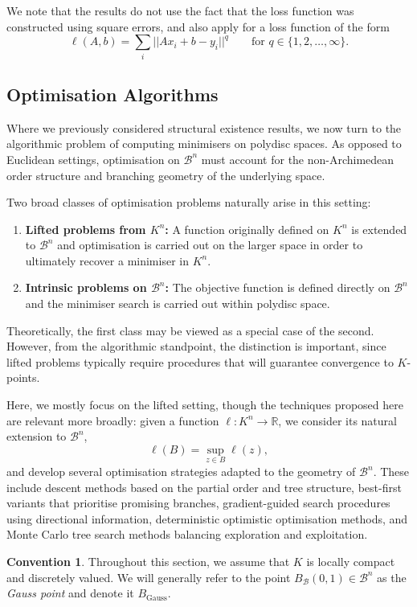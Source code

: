 \documentclass[10pt]{article}
\theoremstyle{definition}
\newtheorem{convention}[theorem]{Convention}
\begin{document}
We note that the results do not use the fact that the loss function was constructed using square errors, and also apply for a loss function of the form
$$
    \ell(A, b) = \sum_i \lvert \lvert A x_i + b - y_i \rvert \rvert ^ q \qquad\text{for }q \in \{1, 2, \dotsc, \infty\}.
$$

\subsection{Optimisation Algorithms}

Where we previously considered structural existence results, we now turn to the algorithmic problem of computing minimisers on polydisc spaces. As opposed to Euclidean settings, optimisation on $\mathcal{B}^n$ must account for the non-Archimedean order structure and branching geometry of the underlying space.

Two broad classes of optimisation problems naturally arise in this setting:
\begin{enumerate}
\item \textbf{Lifted problems from $K^n$:} A function originally defined on $K^n$ is extended to $\mathcal{B}^n$ and optimisation is carried out on the larger space in order to ultimately recover a minimiser in $K^n$.
\item \textbf{Intrinsic problems on $\mathcal{B}^n$:} The objective function is defined directly on $\mathcal{B}^n$ and the minimiser search is carried out within polydisc space.
\end{enumerate}
Theoretically, the first class may be viewed as a special case of the second. However, from the algorithmic standpoint, the distinction is important, since lifted problems typically require procedures that will guarantee convergence to $K$-points.

Here, we mostly focus on the lifted setting, though the techniques proposed here are relevant more broadly: given a function $\ell:K^n\to\mathbb R$, we consider its natural extension to $\mathcal{B}^n$,
$$
\ell(B)=\sup_{z\in B} \ell(z),
$$
and develop several optimisation strategies adapted to the geometry of $\mathcal{B}^n$. These include descent methods based on the partial order and tree structure, best-first variants that prioritise promising branches, gradient-guided search procedures using directional information, deterministic optimistic optimisation methods, and Monte Carlo tree search methods balancing exploration and exploitation.

\begin{convention}
    \label{con:optimisation}
    Throughout this section, we assume that $K$ is locally compact and discretely valued. We will generally refer to the point $B_\mathcal{B}(0, 1) \in \mathcal B ^n$ as the \emph{Gauss point} and denote it $B_\mathrm{Gauss}$.
\end{convention}
\end{document}
